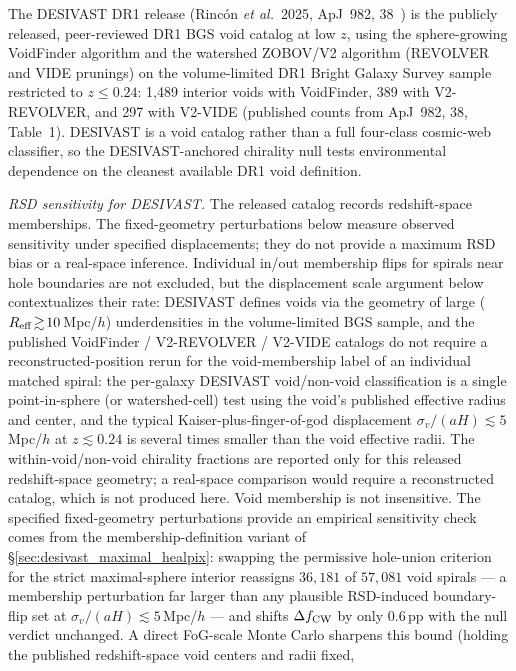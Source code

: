 \documentclass[twocolumn,linenumbers]{aastex702}
\begin{document}
The DESIVAST DR1 release (Rinc\'on \textit{et al.}\ 2025, ApJ~982,
38~\cite{DESIVAST2025}) is the publicly released, peer-reviewed
DR1 BGS void catalog at low $z$, using the sphere-growing VoidFinder
algorithm and the watershed ZOBOV/V2 algorithm (REVOLVER and VIDE
prunings) on the volume-limited DR1 Bright Galaxy Survey sample
restricted to $z \leq 0.24$: 1,489 interior voids with VoidFinder,
389 with V2-REVOLVER, and 297 with V2-VIDE (published counts
from ApJ~982, 38, Table~1). DESIVAST is a void
catalog rather than a full four-class cosmic-web classifier, so the
DESIVAST-anchored chirality null tests environmental dependence on
the cleanest available DR1 void definition.

\emph{RSD sensitivity for DESIVAST.} The released catalog records
redshift-space memberships. The fixed-geometry perturbations below
measure observed sensitivity under specified displacements; they do
not provide a maximum RSD bias or a real-space inference. Individual
in/out membership flips for
spirals near hole boundaries are not excluded, but the displacement
scale argument below contextualizes their rate: DESIVAST defines voids via the geometry of large
($R_{\rm eff}\!\gtrsim\!10$\,Mpc/$h$) underdensities in the
volume-limited BGS sample, and the published VoidFinder /
V2-REVOLVER / V2-VIDE catalogs do not require a
reconstructed-position rerun for the void-membership label of an
individual matched spiral: the per-galaxy DESIVAST void/non-void
classification is a single point-in-sphere (or watershed-cell)
test using the void's published effective radius and center, and
the typical Kaiser-plus-finger-of-god displacement $\sigma_v/(aH)
\lesssim 5$\,Mpc/$h$ at $z \lesssim 0.24$ is several times smaller
than the void effective radii. The within-void/non-void chirality
fractions are reported only for this released redshift-space geometry;
a real-space comparison would require a reconstructed catalog, which is
not produced here. Void membership is not insensitive. The specified
fixed-geometry perturbations provide an empirical sensitivity check
comes from the membership-definition variant of
\S\ref{sec:desivast_maximal_healpix}: swapping the permissive
hole-union criterion for the strict maximal-sphere interior reassigns
$36{,}181$ of $57{,}081$ void spirals --- a membership perturbation
far larger than any plausible RSD-induced boundary-flip set at
$\sigma_v/(aH) \lesssim 5$\,Mpc/$h$ --- and shifts
$\Delta f_{\rm CW}$ by only $0.6$\,pp with the null verdict
unchanged. A direct FoG-scale Monte Carlo sharpens this bound
(holding the published redshift-space void centers and radii fixed,
\end{document}
